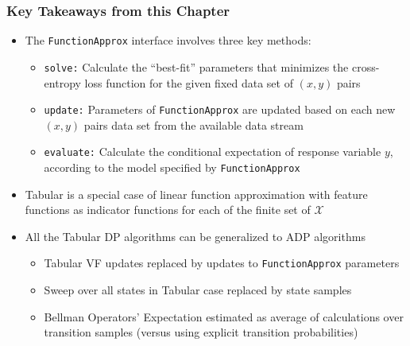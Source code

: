 \documentclass[handout]{beamer}
\begin{document}
\begin{frame}
\frametitle{Key Takeaways from this Chapter}
\pause
\begin{itemize}[<+->]
\item The \lstinline{FunctionApprox} interface involves three key methods:
\begin{itemize}
\item \lstinline{solve:} Calculate the ``best-fit'' parameters that minimizes the cross-entropy loss function for the given fixed data set of $(x,y)$ pairs
\item \lstinline{update:} Parameters of \lstinline{FunctionApprox} are updated based on each new $(x,y)$ pairs data set from the available data stream
\item \lstinline{evaluate:}  Calculate the conditional expectation of response variable $y$, according to the model specified by \lstinline{FunctionApprox}
\end{itemize}
\item Tabular is a special case of linear function approximation with feature functions as indicator functions for each of the finite set of $\mathcal{X}$
\item All the Tabular DP algorithms can be generalized to ADP algorithms
\begin{itemize}
\item Tabular VF updates replaced by updates to \lstinline{FunctionApprox} parameters
\item Sweep over all states in Tabular case replaced by state samples
\item Bellman Operators' Expectation estimated as average of calculations over transition samples (versus using explicit transition probabilities)
\end{itemize}
\end{itemize}
\end{frame}
\end{document}
